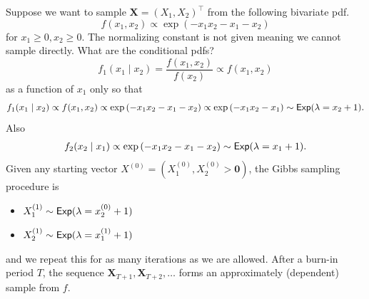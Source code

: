 \begin{exam} \label{exam: gibbs_samp_1}
    Suppose we want to sample $\bm{X} = (X_1 , X_2)^{\intercal}$ from the following bivariate pdf.
    \[
        f(x_1 , x_2) \propto \exp \left( -x_1 x_2 - x_1 - x_2 \right)
    \]
    for $x_1 \geq 0 , x_2 \geq 0$. The normalizing constant is not given meaning we cannot sample directly. What are the conditional pdfs?
    \[
        f_1 (x_1 \mid x_2) = \frac{f(x_1 , x_2)}{f(x_2)} \propto f(x_1 , x_2)
    \]
    as a function of $x_1$ only so that
    \[
        f_1 (x_1 \mid x_2) \propto f(x_1 , x_2) \propto \exp \left( -x_1 x_2 - x_1 - x_2 \right) \propto \exp \left( -x_1 x_2 - x_1 \right) \sim {\sf Exp} (\lambda = x_2 +1).
    \]
    Also
    \begin{align*}
        f_2 (x_2 \mid x_1) \propto \exp \left( -x_1 x_2 - x_1 - x_2 \right) \sim {\sf Exp} (\lambda = x_1 +1).
    \end{align*}
    Given any starting vector $X^{(0)} = \left( X_1^{(0)} , X_2^{(0)} > \bm{0} \right)$, the Gibbs sampling procedure is
    \begin{itemize}
        \item $X_1^{(1)} \sim {\sf Exp} (\lambda = x_2^{(0)} + 1)$
        \item $X_2^{(1)} \sim {\sf Exp} (\lambda = x_1^{(1)} + 1)$
    \end{itemize}
    and we repeat this for as many iterations as we are allowed. After a burn-in period $T$, the sequence $\bm{X}_{T+1} , \bm{X}_{T+2}, \ldots$ forms an approximately (dependent) sample from $f$.
\end{exam}
